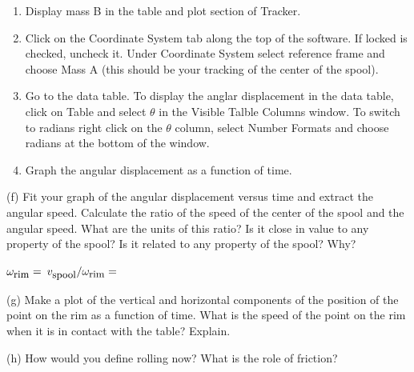 \begin{enumerate}
\item Display mass B in the table and plot section of Tracker. 

\item Click on the Coordinate System tab along the top of the software.  If locked is checked, uncheck it. Under Coordinate System select reference frame and choose Mass A (this should be your tracking of the center of the spool).

\item Go to the data table. To display the anglar displacement in the data table, click on Table and select \( \theta \) in the Visible Talble Columns window. To switch to radians right click on the \( \theta \) column, select Number Formats and choose radians at the bottom of the window.

\item Graph the angular displacement as a function of time.
\end{enumerate}

(f) Fit your graph of the angular displacement versus time and extract the angular
speed. Calculate the ratio of the speed of the center of the spool and the angular
speed. What are the units of this ratio? Is it close in value to any property
of the spool? Is it related to any property of the spool? Why?
\vspace{5mm}

\( \omega _{\mbox{\small rim}}= \)\hfill{} \( v_{\mbox{\small spool}}/
\omega _{\mbox{\small rim}}= \)\hfill{}
\vspace{10mm}

(g) Make a plot of the vertical and horizontal components of the position of
the point on the rim as a function of time.  What is the speed of the point on the rim when it is in contact with the
table? Explain.
\vspace{20mm}

(h) How would you define rolling now? What is the role of friction?

